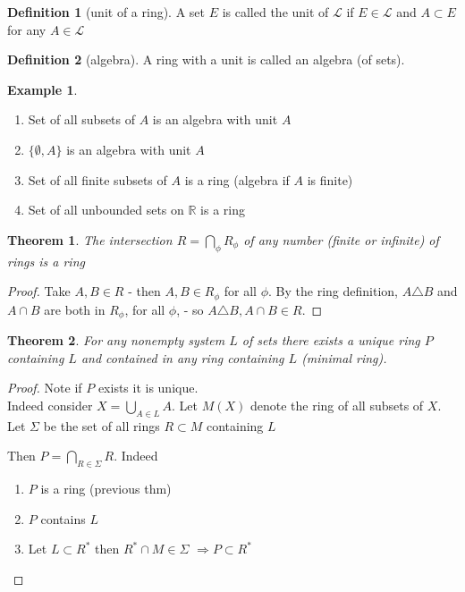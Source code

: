 \documentclass[11pt,a4paper]{report}
\newtheorem{theorem}{Theorem}[section]
\theoremstyle{plain}
\theoremstyle{definition}
\newtheorem*{defn}{Definition}
\newtheorem*{eg}{Example}
\theoremstyle{remark}
\newcommand{\intersection}{\cap}
\newcommand{\Intersection}{\bigcap}
\newcommand{\R}{\mathbb{R}}
\newcommand{\cL}{\mathcal{L}}
\begin{document}
\begin{defn}[unit of a ring]
   A set $E$ is called the unit of $\cL$ if $E \in \cL$ and $A \subset E$ for any $A \in \cL$
\end{defn}


\begin{defn}[algebra]
A ring with a unit is called an algebra (of sets).
\end{defn}

\begin{eg}\;\
  \begin{enumerate}
    \item Set of all subsets of $A$ is an algebra with unit $A$
    \item $\{\emptyset, A\}$ is an algebra with unit $A$
    \item Set of all finite subsets of $A$ is a ring (algebra if $A$ is finite)
    \item Set of all unbounded sets on $\R$ is a ring
  \end{enumerate}
\end{eg}

\begin{theorem}
  The intersection $R = \bigcap_{\phi}R_\phi$ of any number (finite or infinite) of rings is a ring
\end{theorem}
\begin{proof}
  Take $A, B \in R$ - then $A, B \in R_\phi$ for all $\phi$. By the ring definition, $A \triangle B$ and $A \intersection B$ are both in $R_\phi$, for all $\phi$, - so $A \triangle B, A \intersection B \in R$.

\end{proof}

\begin{theorem}
  For any nonempty system $L$ of sets there exists a unique ring $P$ containing $L$ and contained in any ring containing $L$ (minimal ring).
\end{theorem}
\begin{proof}
  Note if $P$ exists it is unique.\\
  Indeed consider $X = \underset{A\in L}{\bigcup} A$.
  Let $M(X)$ denote the ring of all subsets of $X$.
  Let $\Sigma$ be the set of all rings $R \subset M$ containing $L$

  Then $P = \underset{R\in \Sigma}{\bigcap} {R}$. Indeed
  \begin{enumerate}
    \item $P$ is a ring (previous thm) %
    \item $P$ contains $L$
    \item Let $L \subset R^*$ then $R^* \cap M \in \Sigma$ 
    $\Rightarrow P \subset R^*$ %
  \end{enumerate}

\end{proof}
\end{document}
